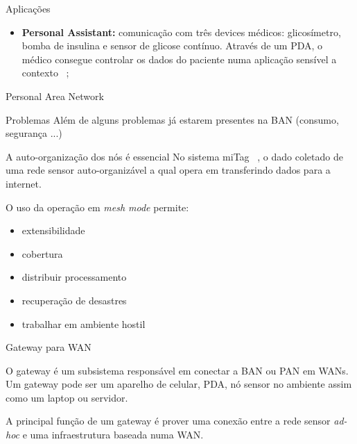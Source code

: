 \documentclass{beamer}
\begin{document}
\begin{frame}{Aplicações}
  \begin{block}{}
    \begin{itemize}[<+->]
     \item \textbf{Personal Assistant:} comunicação com três devices médicos: glicosímetro, bomba de insulina e sensor de glicose contínuo. Através de um PDA, o médico consegue controlar os dados do paciente numa aplicação sensível a contexto ~\cite{sae09};     
    \end{itemize}
  \end{block}
\end{frame}

\begin{frame}{Personal Area Network}
  \begin{block}{Problemas}    
     Além de alguns problemas já estarem presentes na BAN (consumo, segurança ...)
  \end{block}

  \begin{block}{A auto-organização dos nós é essencial}
    No sistema miTag ~\cite{ter08}, o dado coletado de uma rede sensor auto-organizável a qual opera em  transferindo dados para a internet. 

    O uso da operação em \textit{mesh mode} permite:
      \begin{itemize}
       \item extensibilidade
       \item cobertura
       \item distribuir processamento
       \item recuperação de desastres
       \item trabalhar em ambiente hostil
      \end{itemize}
  \end{block}
\end{frame}

\begin{frame}{Gateway para WAN}
  \begin{block}{}
    O gateway é um subsistema responsável em conectar a BAN ou PAN em WANs. Um gateway pode ser um aparelho de celular, PDA, nó sensor no ambiente assim como um laptop ou servidor.
  \end{block}

  \begin{block}{}
    A principal função de um gateway é prover uma conexão entre a rede sensor \textit{ad-hoc} e uma infraestrutura baseada numa WAN.
  \end{block}
\end{frame}
\end{document}
